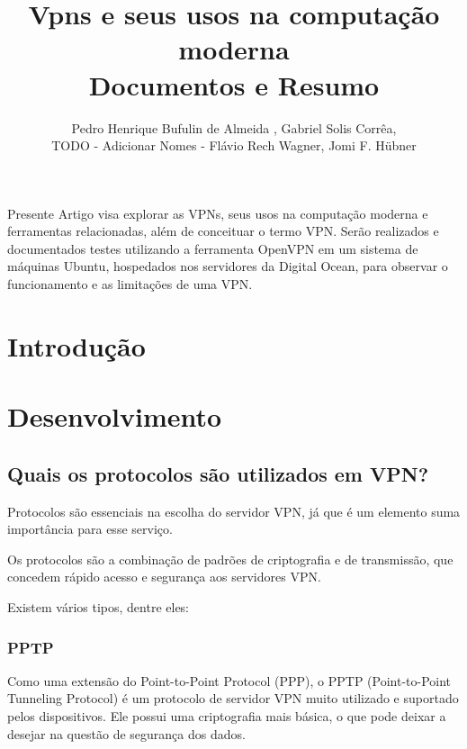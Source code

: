 \documentclass[12pt]{article}
\title{Vpns e seus usos na computação moderna\\ Documentos e Resumo}
\author{Pedro Henrique Bufulin de Almeida \inst{1}, Gabriel Solis Corrêa\inst{2},\\ TODO - Adicionar Nomes - Flávio Rech
  Wagner\inst{1}, Jomi F. Hübner\inst{3} }
\begin{document}
 

\maketitle
     
\begin{resumo} 
  Presente Artigo visa explorar as VPNs, seus usos na computação moderna
  e ferramentas relacionadas, além de conceituar o termo VPN. Serão realizados
  e documentados testes utilizando a ferramenta OpenVPN em um sistema de máquinas Ubuntu,
  hospedados nos servidores da Digital Ocean, para observar o funcionamento e as
  limitações de uma VPN.
\end{resumo}

\section{Introdução}



\section{Desenvolvimento}

\subsection{Quais os protocolos são utilizados em VPN?}
Protocolos são essenciais na escolha do servidor VPN, já que é um elemento suma importância para esse serviço.

Os protocolos são a combinação de padrões de criptografia e de transmissão, que concedem rápido acesso e segurança aos servidores VPN.

Existem vários tipos, dentre eles:

\subsubsection{PPTP}
Como uma extensão do Point-to-Point Protocol (PPP), o PPTP (Point-to-Point Tunneling Protocol) é um protocolo de servidor VPN muito utilizado e suportado pelos dispositivos. Ele possui uma criptografia mais básica, o que pode deixar a desejar na questão de segurança dos dados. 
\end{document}
